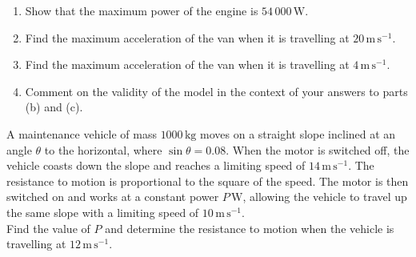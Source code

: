 \documentclass[leqno]{article}
\begin{document}
\begin{enumerate}[
  label=\textbf{\arabic*.},
  leftmargin=*,
  topsep=0pt,
  partopsep=0pt,
  parsep=0pt
]
\begin{enumerate}[label=\textbf{(\alph*)}]
  \item Show that the maximum power of the engine is $54\,000\,\mathrm{W}$.  \\
  \item Find the maximum acceleration of the van when it is travelling at $20\,\mathrm{m\,s^{-1}}$.  \\
  \item Find the maximum acceleration of the van when it is travelling at $4\,\mathrm{m\,s^{-1}}$.  \\
  \item Comment on the validity of the model in the context of your answers to parts (b) and (c).  \\
\end{enumerate}

\newpage

\questionitem

A maintenance vehicle of mass $1000\,\mathrm{kg}$ moves on a straight slope inclined at an angle $\theta$ to the horizontal, where $\sin\theta=0.08$. When the motor is switched off, the vehicle coasts down the slope and reaches a limiting speed of $14\,\mathrm{m\,s^{-1}}$. The resistance to motion is proportional to the square of the speed. The motor is then switched on and works at a constant power $P\,\mathrm{W}$, allowing the vehicle to travel up the same slope with a limiting speed of $10\,\mathrm{m\,s^{-1}}$. \\

Find the value of $P$ and determine the resistance to motion when the vehicle is travelling at $12\,\mathrm{m\,s^{-1}}$.  \\

\newpage

\questionitem

\begin{figure}[H]
    \centering
{}
\end{figure}
\end{enumerate}
\end{document}
